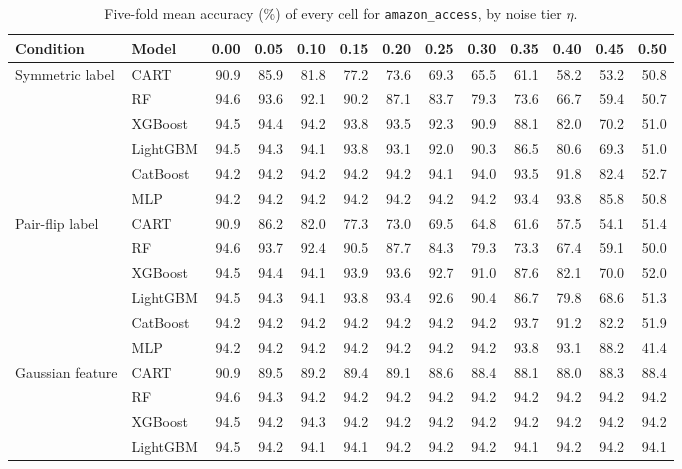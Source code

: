 \begin{table}[p]
\centering
\tiny
\setlength{\tabcolsep}{2.6pt}
\caption{Five-fold mean accuracy (\%) of every cell for \texttt{amazon\_access}, by noise tier $\eta$.}
\label{tab:grid_amazon_access}
\begin{tabular}{@{}llrrrrrrrrrrr@{}}
\toprule
Condition & Model & 0.00 & 0.05 & 0.10 & 0.15 & 0.20 & 0.25 & 0.30 & 0.35 & 0.40 & 0.45 & 0.50 \\
\midrule
Symmetric label & CART & 90.9 & 85.9 & 81.8 & 77.2 & 73.6 & 69.3 & 65.5 & 61.1 & 58.2 & 53.2 & 50.8 \\
 & RF & 94.6 & 93.6 & 92.1 & 90.2 & 87.1 & 83.7 & 79.3 & 73.6 & 66.7 & 59.4 & 50.7 \\
 & XGBoost & 94.5 & 94.4 & 94.2 & 93.8 & 93.5 & 92.3 & 90.9 & 88.1 & 82.0 & 70.2 & 51.0 \\
 & LightGBM & 94.5 & 94.3 & 94.1 & 93.8 & 93.1 & 92.0 & 90.3 & 86.5 & 80.6 & 69.3 & 51.0 \\
 & CatBoost & 94.2 & 94.2 & 94.2 & 94.2 & 94.2 & 94.1 & 94.0 & 93.5 & 91.8 & 82.4 & 52.7 \\
 & MLP & 94.2 & 94.2 & 94.2 & 94.2 & 94.2 & 94.2 & 94.2 & 93.4 & 93.8 & 85.8 & 50.8 \\
\midrule
Pair-flip label & CART & 90.9 & 86.2 & 82.0 & 77.3 & 73.0 & 69.5 & 64.8 & 61.6 & 57.5 & 54.1 & 51.4 \\
 & RF & 94.6 & 93.7 & 92.4 & 90.5 & 87.7 & 84.3 & 79.3 & 73.3 & 67.4 & 59.1 & 50.0 \\
 & XGBoost & 94.5 & 94.4 & 94.1 & 93.9 & 93.6 & 92.7 & 91.0 & 87.6 & 82.1 & 70.0 & 52.0 \\
 & LightGBM & 94.5 & 94.3 & 94.1 & 93.8 & 93.4 & 92.6 & 90.4 & 86.7 & 79.8 & 68.6 & 51.3 \\
 & CatBoost & 94.2 & 94.2 & 94.2 & 94.2 & 94.2 & 94.2 & 94.2 & 93.7 & 91.2 & 82.2 & 51.9 \\
 & MLP & 94.2 & 94.2 & 94.2 & 94.2 & 94.2 & 94.2 & 94.2 & 93.8 & 93.1 & 88.2 & 41.4 \\
\midrule
Gaussian feature & CART & 90.9 & 89.5 & 89.2 & 89.4 & 89.1 & 88.6 & 88.4 & 88.1 & 88.0 & 88.3 & 88.4 \\
 & RF & 94.6 & 94.3 & 94.2 & 94.2 & 94.2 & 94.2 & 94.2 & 94.2 & 94.2 & 94.2 & 94.2 \\
 & XGBoost & 94.5 & 94.2 & 94.3 & 94.2 & 94.2 & 94.2 & 94.2 & 94.2 & 94.2 & 94.2 & 94.2 \\
 & LightGBM & 94.5 & 94.2 & 94.1 & 94.1 & 94.2 & 94.2 & 94.2 & 94.1 & 94.2 & 94.2 & 94.1 \\

\end{tabular}
\end{table}

